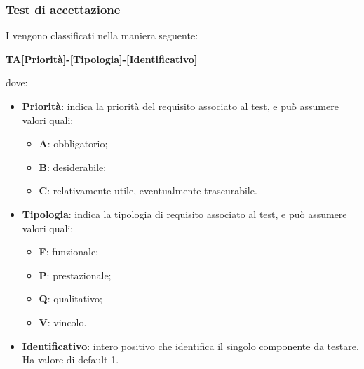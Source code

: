 		\subsubsection{Test di accettazione}
		I  vengono classificati nella maniera seguente:
				\begin{center}
			\textbf{TA[Priorità]-[Tipologia]-[Identificativo]}
		\end{center}		 
		dove:\\
		\begin{itemize}
			\item \textbf{Priorità}: indica la priorità del requisito associato al test, e può assumere valori quali:
			\begin{itemize}
				\item \textbf{A}: obbligatorio;
				\item \textbf{B}: desiderabile;
				\item \textbf{C}: relativamente utile, eventualmente trascurabile.
			\end{itemize}
			\item \textbf{Tipologia}: indica la tipologia di requisito associato al test, e può assumere valori quali:
			\begin{itemize}
				\item \textbf{F}: funzionale;
				\item \textbf{P}: prestazionale;
				\item \textbf{Q}: qualitativo;
				\item \textbf{V}: vincolo.
			\end{itemize}
			\item \textbf{Identificativo}: intero positivo che identifica il singolo componente da testare. Ha valore di default 1.
		\end{itemize}

